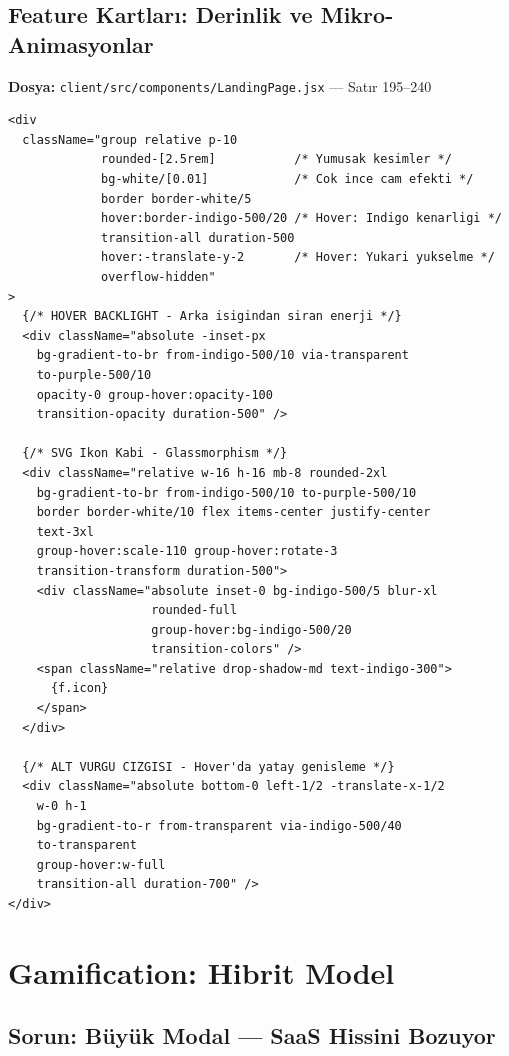 \documentclass[12pt,a4paper]{article}
\begin{document}
\subsection{Feature Kartları: Derinlik ve Mikro-Animasyonlar}

\textbf{Dosya:} \texttt{client/src/components/LandingPage.jsx} — Satır 195--240

\begin{lstlisting}[language=JSX, caption={Premium Kart Tasarimi - LandingPage.jsx:195}]
<div
  className="group relative p-10
             rounded-[2.5rem]           /* Yumusak kesimler */
             bg-white/[0.01]            /* Cok ince cam efekti */
             border border-white/5
             hover:border-indigo-500/20 /* Hover: Indigo kenarligi */
             transition-all duration-500
             hover:-translate-y-2       /* Hover: Yukari yukselme */
             overflow-hidden"
>
  {/* HOVER BACKLIGHT - Arka isigindan siran enerji */}
  <div className="absolute -inset-px
    bg-gradient-to-br from-indigo-500/10 via-transparent
    to-purple-500/10
    opacity-0 group-hover:opacity-100
    transition-opacity duration-500" />

  {/* SVG Ikon Kabi - Glassmorphism */}
  <div className="relative w-16 h-16 mb-8 rounded-2xl
    bg-gradient-to-br from-indigo-500/10 to-purple-500/10
    border border-white/10 flex items-center justify-center
    text-3xl
    group-hover:scale-110 group-hover:rotate-3
    transition-transform duration-500">
    <div className="absolute inset-0 bg-indigo-500/5 blur-xl
                    rounded-full
                    group-hover:bg-indigo-500/20
                    transition-colors" />
    <span className="relative drop-shadow-md text-indigo-300">
      {f.icon}
    </span>
  </div>

  {/* ALT VURGU CIZGISI - Hover'da yatay genisleme */}
  <div className="absolute bottom-0 left-1/2 -translate-x-1/2
    w-0 h-1
    bg-gradient-to-r from-transparent via-indigo-500/40
    to-transparent
    group-hover:w-full
    transition-all duration-700" />
</div>
\end{lstlisting}

\section{Gamification: Hibrit Model}

\subsection{Sorun: Büyük Modal — SaaS Hissini Bozuyor}
\end{document}
